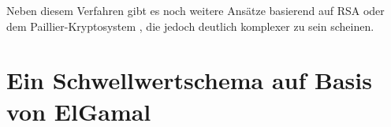 Neben diesem Verfahren gibt es noch weitere Ansätze basierend auf RSA \cite{desmedt1993, nguyen2005} oder dem Paillier-Kryptosystem \cite{paillier1999, damgard2001}, die jedoch deutlich komplexer zu sein scheinen. 

\section{Ein Schwellwertschema auf Basis von ElGamal}

